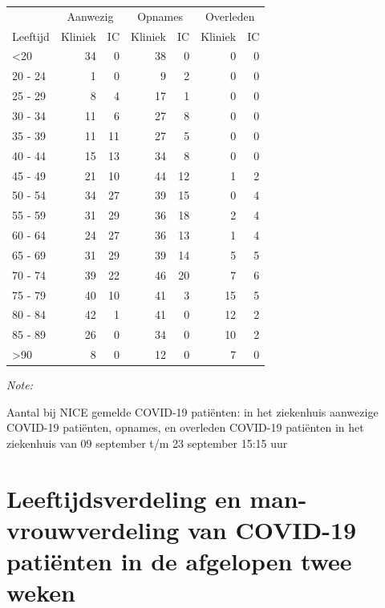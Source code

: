 \documentclass[
  english,
  man,floatsintext]{apa6}
\begin{document}
\begin{table}
\centering\begingroup\fontsize{10}{12}\selectfont

\begin{threeparttable}
\begin{tabular}{lrrrrrr}
\toprule
\multicolumn{1}{c}{ } & \multicolumn{2}{c}{Aanwezig} & \multicolumn{2}{c}{Opnames} & \multicolumn{2}{c}{Overleden} \\
\cmidrule(l{3pt}r{3pt}){2-3} \cmidrule(l{3pt}r{3pt}){4-5} \cmidrule(l{3pt}r{3pt}){6-7}
Leeftijd & Kliniek & IC & Kliniek & IC & Kliniek & IC\\
\midrule
<20 & 34 & 0 & 38 & 0 & 0 & 0\\
20 - 24 & 1 & 0 & 9 & 2 & 0 & 0\\
25 - 29 & 8 & 4 & 17 & 1 & 0 & 0\\
30 - 34 & 11 & 6 & 27 & 8 & 0 & 0\\
35 - 39 & 11 & 11 & 27 & 5 & 0 & 0\\
40 - 44 & 15 & 13 & 34 & 8 & 0 & 0\\
45 - 49 & 21 & 10 & 44 & 12 & 1 & 2\\
50 - 54 & 34 & 27 & 39 & 15 & 0 & 4\\
55 - 59 & 31 & 29 & 36 & 18 & 2 & 4\\
60 - 64 & 24 & 27 & 36 & 13 & 1 & 4\\
65 - 69 & 31 & 29 & 39 & 14 & 5 & 5\\
70 - 74 & 39 & 22 & 46 & 20 & 7 & 6\\
75 - 79 & 40 & 10 & 41 & 3 & 15 & 5\\
80 - 84 & 42 & 1 & 41 & 0 & 12 & 2\\
85 - 89 & 26 & 0 & 34 & 0 & 10 & 2\\
>90 & 8 & 0 & 12 & 0 & 7 & 0\\
\bottomrule
\end{tabular}
\begin{tablenotes}
\item \textit{Note: } 
\item Aantal bij NICE gemelde COVID-19 patiënten: in het ziekenhuis aanwezige COVID-19 patiënten, opnames, en overleden COVID-19 patiënten in het ziekenhuis van 09 september t/m 23 september 15:15 uur
\end{tablenotes}
\end{threeparttable}
\endgroup{}
\end{table}

\newpage

\hypertarget{leeftijdsverdeling-en-man-vrouwverdeling-van-covid-19-patiuxebnten-in-de-afgelopen-twee-weken}{%
\section{Leeftijdsverdeling en man-vrouwverdeling van COVID-19 patiënten in de afgelopen twee weken}\label{leeftijdsverdeling-en-man-vrouwverdeling-van-covid-19-patiuxebnten-in-de-afgelopen-twee-weken}}
\end{document}
